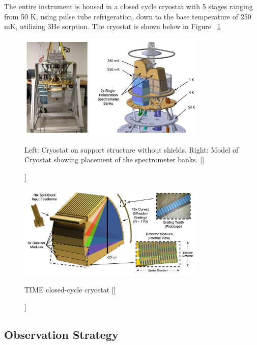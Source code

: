 \documentclass[manuscript]{aastex}
\begin{document}
The entire instrument is housed in a closed cycle cryostat with 5 stages ranging from 50 K, using pulse tube refrigeration, down to the base temperature of 250 mK, utilizing 3He sorption. The cryostat is shown below in Figure ~\ref{fig:jon1}

\begin{figure}[h!]
\centering
\captionsetup{width=0.8\textwidth}
\includegraphics[width=0.8\textwidth]{jon1.png}
\caption[TIME Cryostat -[\cite{Hunacek2016}]]{Left: Cryostat on support structure without shields. Right: Model of Cryostat showing placement of the spectrometer banks. [\cite{Hunacek2016}]}
\label{fig:jon1}
\end{figure}

\begin{figure}[h!]
\centering
\captionsetup{width=0.8\textwidth}
\includegraphics[width=0.8\textwidth]{jon2.png}
\caption[TIME Spectrometer Banks and Detector Modules -[\cite{Hunacek2016}]]{TIME closed-cycle cryostat [\cite{Hunacek2016}]}
\label{fig:jon2}
\end{figure}

\subsection{Observation Strategy}
\end{document}
